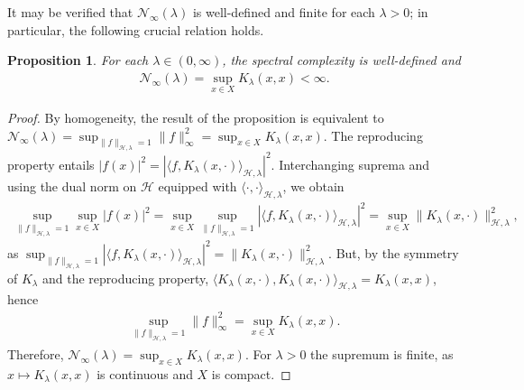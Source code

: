 \documentclass[11pt]{article}
\newtheorem{prop}{Proposition}
\theoremstyle{definition}
\theoremstyle{remark}
\begin{document}
It may be verified that $\mathcal{N}_{\infty}(\lambda)$ is well-defined and finite for each $\lambda>0$; in particular, the following crucial relation holds.
\begin{prop}
\label{prop:2}
For each $\lambda \in (0,\infty)$, the spectral complexity is well-defined and
\begin{align*}
\mathcal{N}_{\infty}(\lambda) =  \sup_{x \in X} K_{\lambda}(x,x) < \infty.
\end{align*}
\end{prop}
\begin{proof}

By homogeneity, the result of the proposition is equivalent to $\mathcal{N}_{\infty}(\lambda) = \sup_{\|f\|_{\mathcal{H},\lambda} = 1} \|f\|_{\infty}^2 = \sup_{x \in X} K_{\lambda}(x,x)$. The reproducing property entails $|f(x)|^2 = |\langle f, K_{\lambda}(x,\cdot)\rangle_{\mathcal{H},\lambda}|^2$.  Interchanging suprema and using the dual norm on $\mathcal{H}$ equipped with $ \langle \cdot, \cdot \rangle_{\mathcal{H},\lambda}$, we obtain
\begin{align*}
\sup_{\|f\|_{\mathcal{H},\lambda} = 1} \sup_{x \in X} |f(x)|^2 =  \sup_{x \in X} \sup_{\|f\|_{\mathcal{H},\lambda} = 1} |\langle f, K_{\lambda}(x,\cdot) \rangle_{\mathcal{H},\lambda}|^2 =  \sup_{x \in X} \|K_{\lambda}(x,\cdot)\|_{\mathcal{H}, \lambda}^2,
\end{align*}
as $\sup_{\|f\|_{\mathcal{H},\lambda} = 1} |\langle f, K_{\lambda}(x,\cdot) \rangle_{\mathcal{H},\lambda}|^2 = \| K_{\lambda}(x,\cdot)\|_{\mathcal{H},\lambda}^2$. But, by the symmetry of $K_{\lambda}$ and the reproducing property, $\langle K_{\lambda}(x,\cdot), K_{\lambda}(x,\cdot) \rangle_{\mathcal{H},\lambda} = K_{\lambda}(x,x)$, hence
\begin{align*}
\sup_{\|f\|_{\mathcal{H},\lambda} = 1} \|f\|_{\infty}^2 = \sup_{x \in X} K_{\lambda}(x,x).
\end{align*}
Therefore, $\mathcal{N}_{\infty}(\lambda) = \sup_{x \in X} K_{\lambda}(x,x)$. For $\lambda>0$ the supremum is finite, as $x \mapsto K_{\lambda}(x,x)$ is continuous and $X$ is compact. 
\end{proof}
\end{document}
